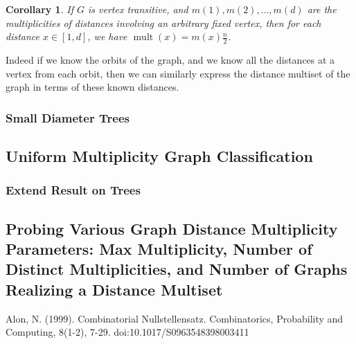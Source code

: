 \documentclass[12]{article}
\DeclareMathOperator{\mult}{mult}
\newtheorem{cor}[thm]{Corollary}
\theoremstyle{definition}
\begin{document}
	\begin{cor}
		If $G$ is vertex transitive, and $m(1), m(2), \ldots, m(d)$ are the multiplicities of distances involving an arbitrary fixed vertex, then for each distance $x \in [1,d]$, we have $\mult(x) = m(x)\tfrac{n}{2}$.
	\end{cor}
	
	Indeed if we know the orbits of the graph, and we know all the distances at a vertex from each orbit, then we can similarly express the distance multiset of the graph in terms of these known distances.
	
	\subsubsection{Small Diameter Trees}
	
	\subsection{Uniform Multiplicity Graph Classification}
	\subsubsection{Extend Result on Trees}
	
	\subsection{Probing Various Graph Distance Multiplicity Parameters: Max Multiplicity, Number of Distinct Multiplicities, and Number of Graphs Realizing a Distance Multiset}
	
	\newpage
	\begin{thebibliography}{100}
		 Alon, N. (1999). Combinatorial Nullstellensatz. Combinatorics, Probability and Computing, 8(1-2), 7-29. doi:10.1017/S0963548398003411
	\end{thebibliography}
	
\end{document}
